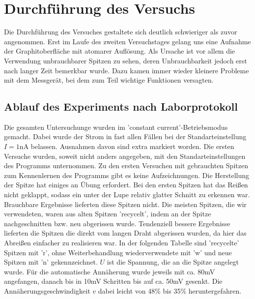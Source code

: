 \section{Durchführung des Versuchs}

Die Durchführung des Versuches gestaltete sich deutlich schwieriger als zuvor angenommen. 
Erst im Laufe des zweiten Versuchstages gelang uns eine Aufnahme der Graphitoberfläche mit 
atomarer Auflösung. Als Ursache ist vor allem die Verwendung unbrauchbarer Spitzen zu sehen, 
deren Unbrauchbarkeit jedoch erst nach langer Zeit bemerkbar wurde. Dazu kamen immer wieder 
kleinere Probleme mit dem Messgerät, bei dem zum Teil wichtige Funktionen versagten. 

\subsection{Ablauf des Experiments nach Laborprotokoll}
Die gesamten Untersuchunge wurden im 'constant current'-Betriebsmodus gemacht. Dabei wurde 
der Strom in fast allen Fällen bei der Standarteinstellung $I = 1\mathrm{nA}$ belassen. 
Ausnahmen davon sind extra markiert worden. 
Die ersten Versuche wurden, soweit nicht anders angegeben,  mit den Standarteinstellungen 
des Programms unternommen. Zu den ersten Versuchen mit gebrauchten Spitzen zum Kennenlernen 
des Programms gibt es keine Aufzeichnungen.
Die Herstellung der Spitze hat einiges an Übung erfordert. Bei den ersten Spitzen hat das 
Reißen nicht geklappt, sodass ein unter der Lupe relativ glatter Schnitt zu erkennen war. 
Brauchbare Ergebnisse lieferten diese Spitzen nicht. Die meisten Spitzen, die wir verwendeten, 
waren aus alten Spitzen 'recycelt', indem an der Spitze nachgeschnitten bzw. neu abgerissen 
wurde. Tendenziell bessere Ergebnisse lieferten die Spitzen die direkt vom langen Draht 
abgerissen wurden, da hier das Abreißen einfacher zu realisieren war. In der folgenden Tabelle 
sind 'recycelte' Spitzen mit 'r', ohne Weiterbehandlung wiederverwendete mit 
'w' und neue Spitzen mit 'n' gekennzeichnet. $U$ ist die Spannung, die an die Spitze angelegt 
wurde. Für die automatische Annäherung wurde jeweils mit ca. 80mV angefangen, danach bis 
in 10mV Schritten bis auf ca. 50mV gesenkt. Die Annäherungsgeschwindigkeit $v$ dabei leicht 
von 48\% bis 35\% heruntergefahren. 
\\\\
\newcommand{\EOL}{\\ \hline}
